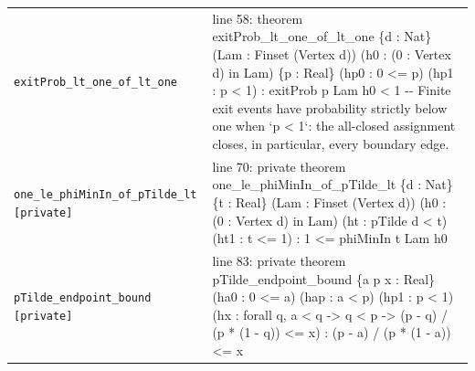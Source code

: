 \documentclass[10pt]{article}
\begin{document}
\begin{longtable}{>{\raggedright\arraybackslash}p{} >{\raggedright\arraybackslash}p{}}
\texttt{exitProb\_\allowbreak{}lt\_\allowbreak{}one\_\allowbreak{}of\_\allowbreak{}lt\_\allowbreak{}one} & {\ttfamily\scriptsize line 58:\allowbreak{} theorem exitProb\_\allowbreak{}lt\_\allowbreak{}one\_\allowbreak{}of\_\allowbreak{}lt\_\allowbreak{}one \{d :\allowbreak{} Nat\} (\allowbreak{}Lam :\allowbreak{} Finset (\allowbreak{}Vertex d)\allowbreak{})\allowbreak{} (\allowbreak{}h0 :\allowbreak{} (\allowbreak{}0 :\allowbreak{} Vertex d)\allowbreak{} in Lam)\allowbreak{} \{p :\allowbreak{} Real\} (\allowbreak{}hp0 :\allowbreak{} 0 <=\allowbreak{} p)\allowbreak{} (\allowbreak{}hp1 :\allowbreak{} p < 1)\allowbreak{} :\allowbreak{} exitProb p Lam h0 < 1 -\allowbreak{}-\allowbreak{} Finite exit events have probability strictly below one when `p < 1`:\allowbreak{} the all-\allowbreak{}closed assignment closes,\allowbreak{} in particular,\allowbreak{} every boundary edge.\allowbreak{}} \\[0.45em]
\texttt{one\_\allowbreak{}le\_\allowbreak{}phiMinIn\_\allowbreak{}of\_\allowbreak{}pTilde\_\allowbreak{}lt [private]} & {\ttfamily\scriptsize line 70:\allowbreak{} private theorem one\_\allowbreak{}le\_\allowbreak{}phiMinIn\_\allowbreak{}of\_\allowbreak{}pTilde\_\allowbreak{}lt \{d :\allowbreak{} Nat\} \{t :\allowbreak{} Real\} (\allowbreak{}Lam :\allowbreak{} Finset (\allowbreak{}Vertex d)\allowbreak{})\allowbreak{} (\allowbreak{}h0 :\allowbreak{} (\allowbreak{}0 :\allowbreak{} Vertex d)\allowbreak{} in Lam)\allowbreak{} (\allowbreak{}ht :\allowbreak{} pTilde d < t)\allowbreak{} (\allowbreak{}ht1 :\allowbreak{} t <=\allowbreak{} 1)\allowbreak{} :\allowbreak{} 1 <=\allowbreak{} phiMinIn t Lam h0} \\[0.45em]
\texttt{pTilde\_\allowbreak{}endpoint\_\allowbreak{}bound [private]} & {\ttfamily\scriptsize line 83:\allowbreak{} private theorem pTilde\_\allowbreak{}endpoint\_\allowbreak{}bound \{a p x :\allowbreak{} Real\} (\allowbreak{}ha0 :\allowbreak{} 0 <=\allowbreak{} a)\allowbreak{} (\allowbreak{}hap :\allowbreak{} a < p)\allowbreak{} (\allowbreak{}hp1 :\allowbreak{} p < 1)\allowbreak{} (\allowbreak{}hx :\allowbreak{} forall q,\allowbreak{} a < q -\allowbreak{}> q < p -\allowbreak{}> (\allowbreak{}p -\allowbreak{} q)\allowbreak{} /\allowbreak{} (\allowbreak{}p *\allowbreak{} (\allowbreak{}1 -\allowbreak{} q)\allowbreak{})\allowbreak{} <=\allowbreak{} x)\allowbreak{} :\allowbreak{} (\allowbreak{}p -\allowbreak{} a)\allowbreak{} /\allowbreak{} (\allowbreak{}p *\allowbreak{} (\allowbreak{}1 -\allowbreak{} a)\allowbreak{})\allowbreak{} <=\allowbreak{} x} \\[0.45em]

\end{longtable}
\end{document}
